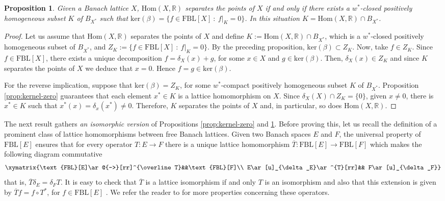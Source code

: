 \documentclass[11pt]{amsart}
\newtheorem{prop}[thm]{Proposition}
\theoremstyle{definition}
\numberwithin{equation}{section}
\newcommand{\fbl}{\text{FBL}}
\begin{document}
\begin{prop}\label{prop:kernel-separate}
    Given a Banach lattice $X$,  $\text{Hom}(X,\mathbb R)$ separates the points of $X$ if and only if there exists a $w^*$-closed positively homogeneous subset $K$ of $B_{X^*}$ such that $\text{ker}(\beta)=\{f\in \fbl[X]\::\: \left.f\right|_{K}=0\}$. In this situation $K=\text{Hom}(X,\mathbb{R})\cap B_{X^*}$.
\end{prop}
\begin{proof}
    Let us assume that $\text{Hom}(X,\mathbb{R})$ separates the points of $X$ and define $K:=\text{Hom}(X,\mathbb{R})\cap B_{X^*}$, which is a $w^*$-closed positively homogeneous subset of $B_{X^*}$, and $Z_K:=\{f\in \fbl[X]\::\: \left.f\right|_K=0\}$. By the preceding proposition, $\text{ker}(\beta)\subset Z_K$. Now, take $f\in Z_K$. Since $f\in \fbl[X]$, there exists a unique decomposition $f=\delta_X(x)+g$, for some $x\in X$ and $g\in\text{ker}(\beta)$. Then, $\delta_X(x)\in Z_K$ and since $K$ separates the points of $X$ we deduce that $x=0$. Hence $f=g\in \text{ker}(\beta)$.
    
    For the reverse implication, suppose that $\text{ker}(\beta)=Z_K$, for some $w^*$-compact positively homogeneous subset $K$ of $B_{X^*}$. Proposition \ref{prop:kernel-zero} guarantees that each element $x^*\in K$ is a lattice homomorphism on $X$. Since $\delta_X(X)\cap Z_K=\{0\}$, given $x\neq 0$, there is $x^*\in K$ such that $x^*(x)=\delta_x(x^*)\neq 0$. Therefore, $K$ separates the points of $X$ and, in particular, so does $\text{Hom}(X,\mathbb R)$.    
\end{proof}

The next result gathers \textit{an isomorphic version} of Propositions \ref{prop:kernel-zero} and \ref{prop:kernel-separate}. Before proving this, let us recall the definition of a prominent class of lattice homomorphisms between free Banach lattices. Given two Banach spaces $E$ and $F$, the universal property of $\fbl[E]$ ensures that for every operator $T:E\to F$ there is a unique lattice homomorphism $\overline{T}:\fbl[E]\to\fbl[F]$ which makes the following diagram commutative
$$
	\xymatrix{\fbl [E]\ar@{-->}[rr]^{\overline T}&&\fbl[F]\\
	E\ar[u]_{\delta_E}\ar^{T}[rr]&& F\ar[u]_{\delta_F}}
$$
that is, $\overline{T}\delta_E=\delta_FT$. It is easy to check that $\overline{T}$ is a lattice isomorphism if and only $T$ is an isomorphism and also that this extension is given by $\overline{T}f=f\circ T^*$, for $f\in \fbl[E]$ \cite[Lemma 3.1]{OTTT24}. We refer the reader to
\cite[Section 3]{OTTT24} for more properties concerning these operators.
\end{document}
